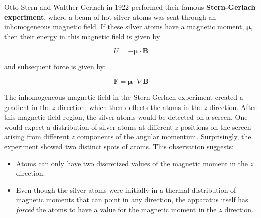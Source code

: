Otto Stern and Walther Gerlach in 1922 performed their famous \textbf{Stern-Gerlach experiment}, where a beam of hot silver atoms was sent through an inhomogeneous magnetic field. If these silver atoms have a magnetic moment, $ \boldsymbol\mu $, then their energy in this magnetic field is given by

\begin{equation}
	U = -\boldsymbol\mu \cdot \mathbf{B} 
\end{equation}

and subsequent force is given by:

\begin{equation}
	\mathbf{F} = \boldsymbol\mu \cdot \nabla \mathbf{B} 
\end{equation}

The inhomogeneous magnetic field in the Stern-Gerlach experiment created a gradient in the $z$-direction, which then deflects the atoms in the $z$ direction. After this magnetic field region, the silver atoms would be detected on a screen. One would expect a distribution of silver atoms at different $z$ positions on the screen arising from different $z$ components of the angular momentum. Surprisingly, the experiment showed two distinct spots of atoms. This observation suggests:

\begin{itemize}
	\item Atoms can only have two discretized values of the magnetic moment in the $z$ direction. 
	\item Even though the silver atoms were initially in a thermal distribution of magnetic moments that can point in any direction, the apparatus itself has \textit{forced} the atoms to have a value for the magnetic moment in the $z$ direction.

\end{itemize}

